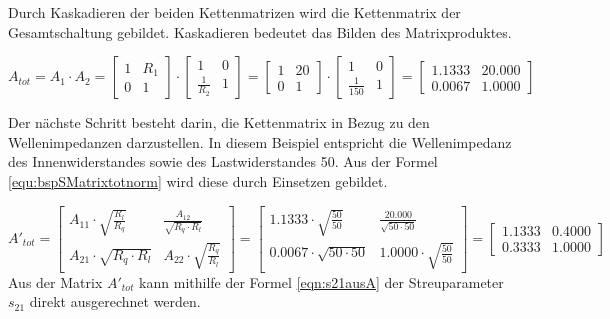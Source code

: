 Durch Kaskadieren der beiden Kettenmatrizen wird die Kettenmatrix der Gesamtschaltung gebildet. Kaskadieren bedeutet das Bilden des Matrixproduktes.

\begin{equation}\label{equ:bspSMatrixtot}
A_{tot} = A_1 \cdot A_2 = \left[\begin{matrix}
			1&R_1\\0&1
			\end{matrix}\right] \cdot  \left[\begin{matrix}
			1&0\\\frac{1}{R_2}&1
			\end{matrix}\right]
			= \left[\begin{matrix}
			1&20\\0&1
			\end{matrix}\right] \cdot \left[\begin{matrix}
			1&0\\\frac{1}{150}&1
			\end{matrix}\right] =
			\left[\begin{matrix}
			1.1333&20.000\\0.0067&1.0000
			\end{matrix}\right]
\end{equation}

Der nächste Schritt besteht darin, die Kettenmatrix in Bezug zu den Wellenimpedanzen darzustellen. In diesem Beispiel entspricht die Wellenimpedanz des Innenwiderstandes sowie des Lastwiderstandes 50\Omega . Aus der Formel \ref{equ:bspSMatrixtotnorm}  wird diese durch Einsetzen gebildet.

\begin{equation}\label{equ:bspSMatrixtotnorm}
			A'_{tot} = \left[\begin{matrix}
			A_{11}\cdot\sqrt{ \frac{ R_{ l } }{ R_{ q } } }
			&
			\frac{A_{12}}{\sqrt{R_q \cdot R_l}}
			\\
			A_{21} \cdot \sqrt{R_q \cdot R_l}
			&
			A_{22} \cdot \sqrt{\frac{R_q}{R_l}}
			\end{matrix}\right]
			=
			\left[\begin{matrix}
			1.1333\cdot\sqrt{ \frac{ 50}{50} }
			&
			\frac{20.000}{\sqrt{50\cdot 50}}
			\\
			0.0067 \cdot \sqrt{50 \cdot 50}
			&
			1.0000 \cdot \sqrt{\frac{50}{50}}
			\end{matrix}\right]
			=
			\left[\begin{matrix}
			1.1333
			&
			0.4000
			\\
			0.3333
			&
			1.0000
			\end{matrix}\right]
\end{equation}
Aus der Matrix $A'_{tot}$ kann mithilfe der Formel \ref{eqn:s21ausA} der Streuparameter $s_{21}$ direkt ausgerechnet werden.

